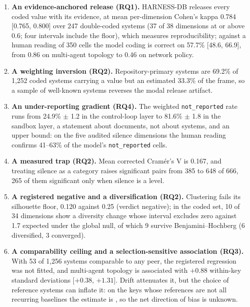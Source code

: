 \begin{enumerate}
  \item \textbf{An evidence-anchored release (RQ1).} HARNESS-DB releases every coded value with its evidence,
  at mean per-dimension Cohen's kappa 0.784 [0.765, 0.800] over 247 double-coded systems (37 of 38
  dimensions at or above 0.6; four intervals include the floor), which measures reproducibility; against a
  human reading of 350 cells the model coding is correct on 57.7\% [48.6, 66.9], from 0.86 on multi-agent
  topology to 0.46 on network policy.

  \item \textbf{A weighting inversion (RQ2).} Repository-primary systems are 69.2\% of 1,252 coded
  systems carrying a value but an estimated 33.3\% of the frame, so a sample of well-known systems
  reverses the modal release artifact.

  \item \textbf{An under-reporting gradient (RQ4).} The weighted \texttt{not\_reported} rate runs from
  24.9\% $\pm$ 1.2 in the control-loop layer to 81.6\% $\pm$ 1.8 in the sandbox layer, a statement
  about documents, not about systems, and an upper bound: on the five audited silence dimensions the
  human reading confirms 41--63\% of the model's \texttt{not\_reported} cells.

  \item \textbf{A measured trap (RQ2).} Mean corrected Cram\'er's V is 0.167, and treating silence as a
  category raises significant pairs from 385 to 648 of 666, 265 of them significant only when silence
  is a level.

  \item \textbf{A registered negative and a diversification (RQ2).} Clustering fails its silhouette
  floor, 0.120 against 0.25 (verdict negative); in the coded set, 10 of 34 dimensions show a diversity
  change whose interval
  excludes zero against 1.7 expected under the global null, of which 9 survive Benjamini--Hochberg
  (6 diversified, 3 converged).

  \item \textbf{A comparability ceiling and a selection-sensitive association (RQ3).} With 53 of 1,256 systems
  comparable to any peer, the registered regression was not fitted, and multi-agent topology is associated
  with $+0.88$ within-key standard deviations [$+0.38$, $+1.31$]. Drift attenuates it, but the choice of
  reference systems can inflate it: on the \rqXPOtherKeys{} keys whose references are not all recurring
  baselines the estimate is \rqXPOtherEffect{} \rqXPOtherCI{}, so the net direction of bias is unknown.


\end{enumerate}
